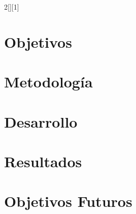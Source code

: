 \documentclass[letterpaper,11pt]{article} %
\begin{document}
	





\inserttitle

\begin{abstract}
	
\end{abstract}
\hspace{1.7cm}
%
\begin{multicols}{2}[][1]
    \section{Objetivos}
    
    \section{Metodología}
    
    \section{Desarrollo}
    
    \section{Resultados}
    
    \section{Objetivos Futuros}
    
\end{multicols}

\end{document}
